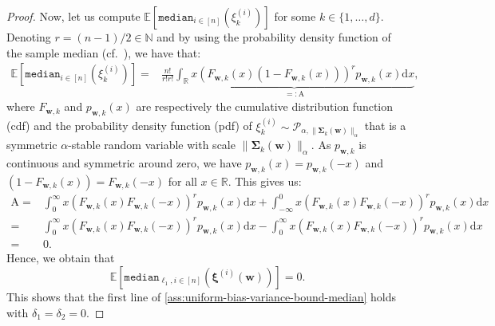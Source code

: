 \documentclass[10pt]{article} %
\renewcommand{\vec}[1]{\bm{#1}}
\newcommand{\E}[1]{\mathbb{E}\left[#1\right] }
\newcommand{\median}{\texttt{median}}
\newcommand{\samplemedian}[1]{\texttt{median}_{#1,i\in[n]}}
\begin{document}
\begin{proof}
Now, let us compute $\E{\median_{i\in[n]}\left( \xi^{(i)}_k\right) }$ for some $k \in \{1,\dots, d\}$. Denoting $r = (n-1)/2 \in\mathbb{N}$ and by using the probability density function of the sample median (cf.\ \citet{maritz1978note}), we have that:
\begin{align*}
    \E{\median_{i\in[n]}\left( \xi^{(i)}_k\right) } =& \frac{n!}{r!r!} \underbrace{\int_{\mathbb{R}} x \left( F_{\vec{w},k}(x) (1-  F_{\vec{w},k}(x)) \right)^r p_{\vec{w},k}(x) \mathrm{d} x}_{=:\mathrm{A}},
\end{align*}
where $F_{\vec{w},k}$ and $p_{\vec{w},k}(x)$ are respectively the cumulative distribution function (cdf) and the probability density function (pdf) of $\xi_k^{(i)} \sim \mathcal{P}_{\alpha, \|\vec{\Sigma}_{k}(\vec{w})\|_{\alpha} }$ that is a symmetric $\alpha$-stable random variable with scale $\|\vec{\Sigma}_{k}(\vec{w})\|_{\alpha} $. As $p_{\vec{w},k}$ is continuous and symmetric around zero, we have $p_{\vec{w},k}(x) = p_{\vec{w},k}(-x)$ and $ (1-  F_{\vec{w},k}(x)) = F_{\vec{w},k}(-x)$ for all $x\in \mathbb{R}$. This gives us:
\begin{align*}
    \mathrm{A} =& \int_{0}^\infty x \left( F_{\vec{w},k}(x)  F_{\vec{w},k}(-x) \right)^r p_{\vec{w},k}(x) \mathrm{d} x + \int_{-\infty}^0 x \left( F_{\vec{w},k}(x)  F_{\vec{w},k}(-x) \right)^r p_{\vec{w},k}(x) \mathrm{d} x \\
    =& \int_{0}^\infty x \left( F_{\vec{w},k}(x)  F_{\vec{w},k}(-x) \right)^r p_{\vec{w},k}(x) \mathrm{d} x - \int_{0}^\infty x \left( F_{\vec{w},k}(x)  F_{\vec{w},k}(-x) \right)^r p_{\vec{w},k}(x) \mathrm{d} x \\
    =& 0.
\end{align*}
Hence, we obtain that
$$\E{ \samplemedian{\ell_1}\left( \vec{\xi}^{(i)}(\vec{w}) \right) } = 0.$$
This shows that the first line of \cref{ass:uniform-bias-variance-bound-median} holds with $\delta_1 = \delta_2 =0$. 


\end{proof}
\end{document}
